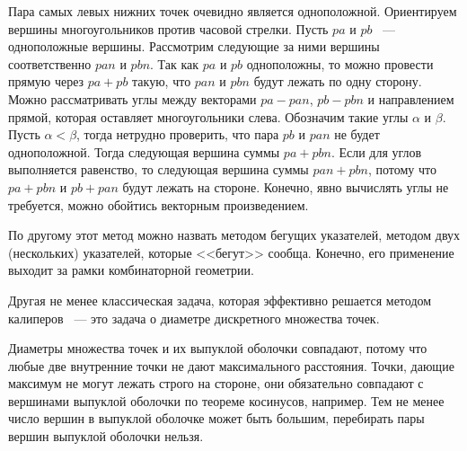 Пара самых левых нижних точек очевидно является одноположной. Ориентируем
вершины многоугольников против часовой стрелки. Пусть $pa$ и $pb$ ~---
одноположные вершины. Рассмотрим следующие за ними вершины соответственно
$pan$ и $pbn$. Так как $pa$ и $pb$ одноположны, то можно провести прямую
через $pa + pb$ такую, что $pan$ и $pbn$ будут лежать по одну сторону.
Можно рассматривать углы между векторами $pa-pan$, $pb-pbn$ и
направлением прямой, которая оставляет многоугольники слева. Обозначим
такие углы $\alpha$ и $\beta$. Пусть $\alpha < \beta$, тогда нетрудно
проверить, что пара $pb$ и $pan$ не будет одноположной. Тогда следующая
вершина суммы $pa + pbn$. Если для углов выполняется равенство,
то следующая вершина суммы $pan + pbn$, потому что $pa + pbn$ и
$pb + pan$ будут лежать на стороне. Конечно, явно вычислять
углы не требуется, можно обойтись векторным произведением.

По другому этот метод можно назвать методом бегущих указателей,
методом двух (нескольких) указателей, которые <<бегут>> сообща.
Конечно, его применение выходит за рамки комбинаторной геометрии.

Другая не менее классическая задача, которая эффективно решается методом
калиперов ~--- это задача о диаметре дискретного множества точек.

Диаметры множества точек и их выпуклой оболочки совпадают,
потому что любые две внутренние точки не дают максимального
расстояния. Точки, дающие максимум не могут лежать строго на стороне,
они обязательно совпадают с вершинами выпуклой оболочки
по теореме косинусов, например. Тем не менее число вершин
в выпуклой оболочке может быть большим, перебирать
пары вершин выпуклой оболочки нельзя.\\

